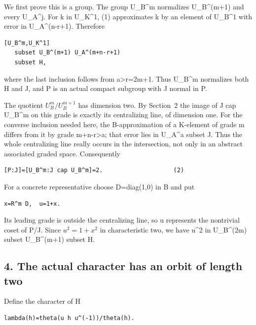We first prove this is a group. The group U\_B\^{}m normalizes
U\_B\^{}(m+1) and every U\_A\^{}j. For k in U\_K\^{}1, (1) approximates
k by an element of U\_B\^{}1 with error in U\_A\^{}(n-r+1). Therefore

\begin{Verbatim}[fontsize=\small,breaklines=true,breakanywhere=true]
[U_B^m,U_K^1]
   subset U_B^(m+1) U_A^(m+n-r+1)
   subset H,
\end{Verbatim}

where the last inclusion follows from a\textgreater r=2m+1. Thus
U\_B\^{}m normalizes both H and J, and P is an actual compact subgroup
with J normal in P.

The quotient \(U_B^m/U_B^{m+1}\) has dimension two. By
Section~2 the image of J cap U\_B\^{}m on this grade is exactly its
centralizing line, of dimension one. For the converse inclusion needed
here, the B-approximation of a K-element of grade m differs from it by
grade m+n-r\textgreater a; that error lies in U\_A\^{}a subset J. Thus
the whole centralizing line really occurs in the intersection, not only
in an abstract associated graded space. Consequently

\begin{Verbatim}[fontsize=\small,breaklines=true,breakanywhere=true]
[P:J]=[U_B^m:J cap U_B^m]=2.                    (2)
\end{Verbatim}

For a concrete representative choose D=diag(1,0) in B and put

\begin{Verbatim}[fontsize=\small,breaklines=true,breakanywhere=true]
x=R^m D,  u=1+x.
\end{Verbatim}

Its leading grade is outside the centralizing line, so u represents the
nontrivial coset of P/J. Since \(u^2=1+x^2\) in
characteristic two, we have u\^{}2 in U\_B\^{}(2m) subset U\_B\^{}(m+1)
subset H.

\hypertarget{rank~4-the-actual-character-has-an-orbit-of-length-two}{%
\subsection{4. The actual character has an orbit of length
two}\label{rank~4-the-actual-character-has-an-orbit-of-length-two}}

Define the character of H

\begin{Verbatim}[fontsize=\small,breaklines=true,breakanywhere=true]
lambda(h)=theta(u h u^(-1))/theta(h).
\end{Verbatim}

